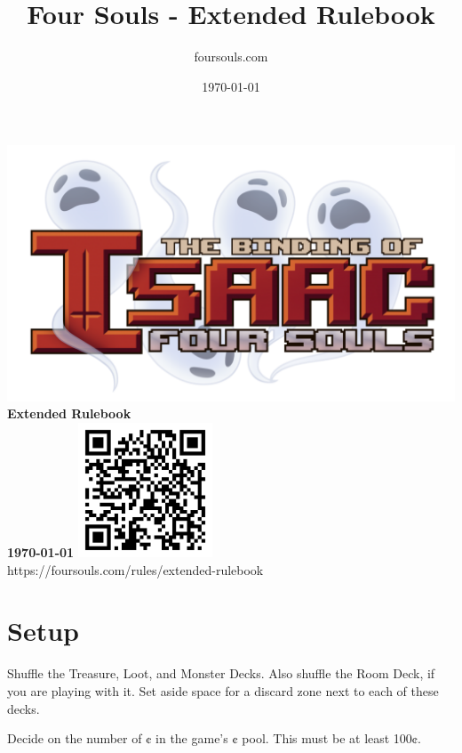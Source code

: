 \documentclass[a4paper, twoside]{report} %
\title{Four Souls - Extended Rulebook} %
\author{foursouls.com} %
\date{\today} %
\begin{document}
    \begin{titlepage}
        \centering
        \vfill
        \includegraphics[width=\textwidth]{assets/foursouls.png}
        \vskip2cm
        {\bfseries\LARGE
        Extended Rulebook\\
        \vskip5mm
        \Large
        \today
        }
        \vskip2cm
        \includegraphics[width=4cm]{assets/qr-code.pdf}\\
        https://foursouls.com/rules/extended-rulebook
    \end{titlepage}
    \tableofcontents
    \newpage

    \chapter{Setup}
    \label{setup}
    Shuffle the Treasure, Loot, and Monster Decks. Also shuffle the Room Deck, if you are playing with it. Set aside space for a discard zone next to each of these decks.

    Decide on the number of ¢ in the game’s ¢ pool. This must be at least 100¢.
\end{document}
